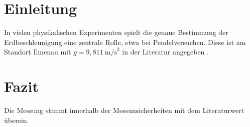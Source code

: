 \documentclass{protokoll}
\begin{document}
\section{Einleitung}

In vielen physikalischen Experimenten spielt die 
genaue Bestimmung der Erdbeschleunigung eine zentrale Rolle, etwa bei Pendelversuchen. Diese ist am Standort Ilmenau 
mit $g = 9{,}811\ \text{m/s}^2$ in der Literatur angegeben \cite[S.~25]{mustermann2020}.

\section{Fazit}

Die Messung stimmt innerhalb der Messunsicherheiten mit dem Literaturwert überein.

\printbibliography
\end{document}
